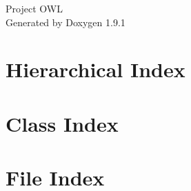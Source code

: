 \let\mypdfximage\pdfximage\def\pdfximage{\immediate\mypdfximage}\documentclass[twoside]{book}
\newcommand{\+}{\discretionary{\mbox{\scriptsize$\hookleftarrow$}}{}{}}
\newcommand{\clearemptydoublepage}{%
  \newpage{\pagestyle{empty}\cleardoublepage}%
}
\begin{document}
\raggedbottom

\hypersetup{pageanchor=false,
             bookmarksnumbered=true,
             pdfencoding=unicode
            }
\begin{titlepage}
\vspace*{7cm}
\begin{center}%
{\Large Project OWL }\\
\vspace*{1cm}
{\large Generated by Doxygen 1.9.1}\\
\end{center}
\end{titlepage}
\clearemptydoublepage
{}
\tableofcontents
\clearemptydoublepage
{}
\hypersetup{pageanchor=true}

\chapter{Hierarchical Index}

\chapter{Class Index}

\chapter{File Index}

\end{document}
